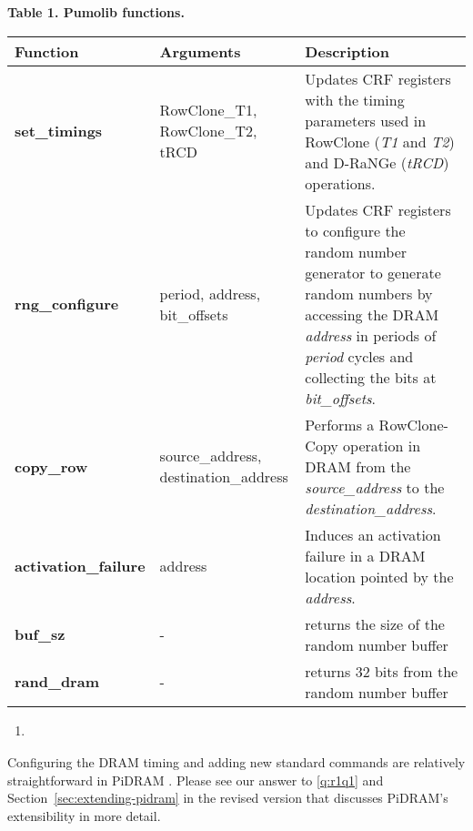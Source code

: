 \textbf{Table 1. Pumolib functions.}
\vspace{3mm}
  \centering
  \scriptsize
  \begin{tabular}{@{} lm{15em}m{42em} @{}}
  \toprule
  {\textbf{Function}} &  {\textbf{Arguments}} &  {\textbf{Description}}\\        
  \midrule
  \textbf{set\_timings} & RowClone\_T1, RowClone\_T2, tRCD & Updates CRF registers with the timing parameters used in RowClone (\emph{T1} and \emph{T2}) and D-RaNGe (\emph{tRCD}) operations.\\
  \textbf{rng\_configure} & period, address, bit\_offsets & Updates CRF registers to configure the random number generator to generate random numbers by accessing the DRAM \emph{address} in periods of \emph{period} cycles and collecting the bits at \emph{bit\_offsets}.\\
  \textbf{copy\_row} & source\_address, destination\_address & Performs a RowClone-Copy operation in DRAM from the \emph{source\_address} to the \emph{destination\_address}.\\
  \textbf{activation\_failure} & address & Induces an activation failure in a DRAM location pointed by the \emph{address}.\\
  \textbf{buf\_sz} & - & returns the size of the random number buffer\\
  \textbf{rand\_dram} & - & returns 32 bits from the random number buffer\\
  \midrule
  \end{tabular}

\yyboxend 

\bigbreak
\begin{tcolorbox}
    \begin{enumerate}[label=R3/\arabic*]
       \addtocounter{enumi}{3}
        \item \label{q:r3q4} 
    \end{enumerate}
\end{tcolorbox} 

Configuring the DRAM timing and adding new standard commands are relatively straightforward in PiDRAM . Please see our answer to \ref{q:r1q1} and Section~\ref{sec:extending-pidram} in the revised version that discusses PiDRAM's extensibility in more detail.

